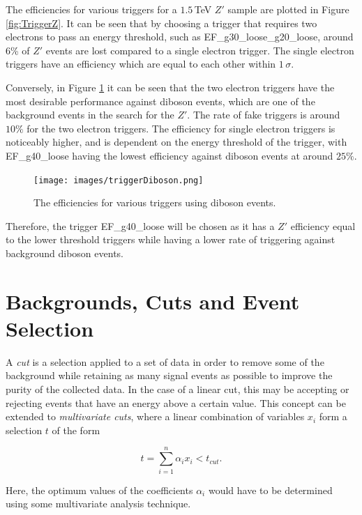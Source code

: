 \documentclass{article}
\begin{document}
The efficiencies for various triggers for a $1.5\,$TeV $Z'$ sample are plotted in Figure \ref{fig:TriggerZ}. It can be seen that by choosing a trigger that requires two electrons to pass an energy threshold, such as EF\_g30\_loose\_g20\_loose, around 6\% of $Z'$ events are lost compared to a single electron trigger. The single electron triggers have an efficiency which are equal to each other within $1\,\sigma$.

Conversely, in Figure \ref{fig:TriggerDB} it can be seen that the two electron triggers have the most desirable performance against diboson events, which are one of the background events in the search for the $Z'$. The rate of fake triggers is around $10\%$ for the two electron triggers. The efficiency for single electron triggers is noticeably higher, and is dependent on the energy threshold of the trigger, with EF\_g40\_loose having the lowest efficiency against diboson events at around $25\%$.
\begin{figure}[h]
    \centering \texttt{[image: images/triggerDiboson.png]} \caption{The efficiencies for various triggers using diboson events. \label{fig:TriggerDB} }
\end{figure}

Therefore, the trigger EF\_g40\_loose will be chosen as it has a $Z'$ efficiency equal to the lower threshold triggers while having a lower rate of triggering against background diboson events.

\section{Backgrounds, Cuts and Event Selection}
\label{sec:cuts}

A \textit{cut} is a selection applied to a set of data in order to remove some of the background while retaining as many signal events as possible to improve the purity of the collected data. In the case of a linear cut, this may be accepting or rejecting events that have an energy above a certain value. This concept can be extended to \textit{multivariate cuts}, where a linear combination of variables $x_i$ form a selection $t$ of the form

\begin{equation}
t = \sum_{i=1}^{n}\alpha_i x_i < t_{cut}.
\end{equation}

Here, the optimum values of the coefficients $\alpha_i$ would have to be determined using some multivariate analysis technique. 
\end{document}
